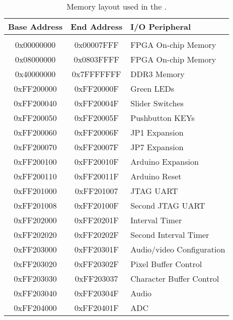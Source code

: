 \begin{table}[h]
    \begin{center}
    \begin{tabular}{c|c|l}
            \textbf{Base Address}
            & \textbf{End Address}
            & \textbf{I/O Peripheral}
				\\\hline\vspace{-3mm}\\
            0x00000000
            & 0x00007FFF
            & FPGA On-chip Memory
        \\
            0x08000000
            & 0x0803FFFF
            & FPGA On-chip Memory
        \\
            0x40000000
            & 0x7FFFFFFF
            & DDR3 Memory
        \\
            0xFF200000
            & 0xFF20000F
            & Green LEDs
        \\
            0xFF200040
            & 0xFF20004F
            & Slider Switches
        \\
            0xFF200050
            & 0xFF20005F
            & Pushbutton KEYs
        \\
            0xFF200060
            & 0xFF20006F
            & JP1 Expansion
        \\
            0xFF200070
            & 0xFF20007F
            & JP7 Expansion
        \\
            0xFF200100
            & 0xFF20010F
            & Arduino Expansion
        \\
            0xFF200110
            & 0xFF20011F
            & Arduino Reset
        \\
            0xFF201000
            & 0xFF201007
            & JTAG UART
        \\
            0xFF201008
            & 0xFF20100F
            & Second JTAG UART
        \\
            0xFF202000
            & 0xFF20201F
            & Interval Timer
        \\
            0xFF202020
            & 0xFF20202F
            & Second Interval Timer
				\\
						0xFF203000
						& 0xFF20301F
						& Audio/video Configuration
				\\
						0xFF203020
						& 0xFF20302F
						& Pixel Buffer Control
				\\
						0xFF203030
						& 0xFF203037
						& Character Buffer Control
				\\ 
						0xFF203040
						& 0xFF20304F
						& Audio
        \\
            0xFF204000
            & 0xFF20401F
            & ADC
        \\
    \end{tabular}
    \caption{Memory layout used in the \systemName.}
    \label{tab:memorylayout}
    \end{center}
\end{table}

